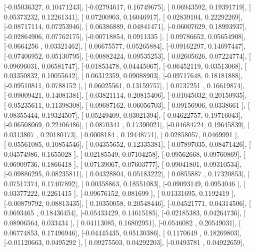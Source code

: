 \documentclass{article}
\begin{document}
       [-0.05036327,  0.10471243],
       [-0.02794617,  0.16749675],
       [ 0.06943592,  0.19391719],
       [ 0.05373232,  0.12261341],
       [ 0.07200903,  0.16046917],
       [ 0.02839104,  0.22292269],
       [-0.08717114,  0.07253946],
       [ 0.06386889,  0.04841471],
       [-0.06007629,  0.18993937],
       [-0.02864906,  0.07762175],
       [-0.00718854,  0.0911335 ],
       [ 0.09786652,  0.05654908],
       [-0.0664256 ,  0.03321462],
       [ 0.06675577,  0.05265884],
       [-0.09162297,  0.14697447],
       [-0.07406952,  0.05130795],
       [-0.00882424,  0.09535253],
       [ 0.02605626,  0.07224774],
       [ 0.09696031,  0.06581747],
       [-0.01853478,  0.04445067],
       [-0.06452119,  0.03513068],
       [ 0.03350832,  0.10055642],
       [ 0.06312359,  0.09088903],
       [-0.09717648,  0.18181888],
       [-0.09510811,  0.0788152 ],
       [ 0.06025561,  0.13159757],
       [ 0.0737251 ,  0.16619874],
       [-0.09009421,  0.14081381],
       [-0.03821114,  0.20815406],
       [-0.01045032,  0.20150935],
       [-0.05235611,  0.11398308],
       [-0.09687162,  0.06056703],
       [ 0.09156906,  0.0338661 ],
       [ 0.08355444,  0.19324507],
       [-0.05249409,  0.03021394],
       [ 0.04622757,  0.19716043],
       [-0.06508069,  0.22406486],
       [ 0.0870341 ,  0.17390021],
       [-0.04684724,  0.19645839],
       [ 0.0313807 ,  0.20180173],
       [ 0.0008184 ,  0.19448771],
       [ 0.02858057,  0.0469991 ],
       [-0.05561085,  0.10854546],
       [-0.04355652,  0.12335381],
       [-0.07897035,  0.08471426],
       [ 0.04574986,  0.1655028 ],
       [ 0.02185549,  0.07104258],
       [-0.09562668,  0.09760869],
       [ 0.06909736,  0.1866418 ],
       [ 0.07139067,  0.07603777],
       [ 0.09041801,  0.09310534],
       [-0.09886295,  0.08235811],
       [ 0.04328804,  0.05183222],
       [ 0.0855887 ,  0.17320853],
       [ 0.07517374,  0.17407892],
       [ 0.00358863,  0.18551083],
       [-0.09093149,  0.0954046 ],
       [ 0.03377222,  0.2261415 ],
       [-0.09676152,  0.081699  ],
       [ 0.01331695,  0.1192419 ],
       [-0.00879792,  0.08813435],
       [ 0.10350058,  0.20548446],
       [-0.04521771,  0.04314506],
       [ 0.0693465 ,  0.18436454],
       [-0.05433429,  0.14615185],
       [-0.02185383,  0.04264736],
       [ 0.08906564,  0.033434  ],
       [ 0.04113085,  0.16802951],
       [-0.0546082 ,  0.20549031],
       [ 0.06774853,  0.17496946],
       [-0.04445435,  0.05130386],
       [ 0.1170649 ,  0.18269803],
       [-0.01120663,  0.0495292 ],
       [ 0.09275503,  0.04292203],
       [-0.0493781 ,  0.04922659],
\end{document}
